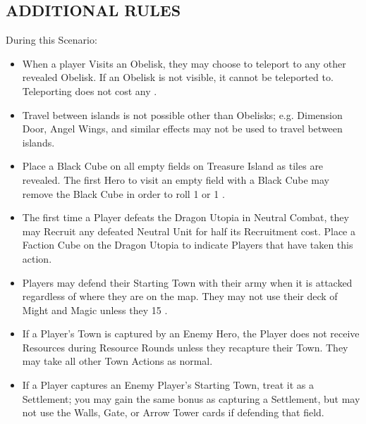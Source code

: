 \begin{multicols*}{2}
\subsection*{\MakeUppercase{Additional Rules}}

During this Scenario:

\begin{itemize}
  \item When a player Visits an Obelisk, they may choose to teleport to any other revealed Obelisk. If an Obelisk is not visible, it cannot be teleported to. Teleporting does not cost any .
  \item Travel between islands is not possible other than Obelisks; e.g. Dimension Door, Angel Wings, and similar effects may not be used to travel between islands.
  \item Place a Black Cube on all empty fields on Treasure Island as tiles are revealed. The first Hero to visit an empty field with a Black Cube may remove the Black Cube in order to roll 1  or 1 .
  \item The first time a Player defeats the Dragon Utopia in Neutral Combat, they may Recruit any defeated Neutral Unit for half its Recruitment cost. Place a Faction Cube on the Dragon Utopia to indicate Players that have taken this action.
  \item Players may defend their Starting Town with their army when it is attacked regardless of where they are on the map. They may not use their deck of Might and Magic unless they  15 .
  \item If a Player's Town is captured by an Enemy Hero, the Player does not receive Resources during Resource Rounds unless they recapture their Town. They may take all other Town Actions as normal.
  \item If a Player captures an Enemy Player's Starting Town, treat it as a Settlement; you may gain the same bonus as capturing a Settlement, but may not use the Walls, Gate, or Arrow Tower cards if defending that field.
\end{itemize}

\vspace*{\fill}

\begin{center}
\end{center}

\vspace*{\fill}

\end{multicols*}

